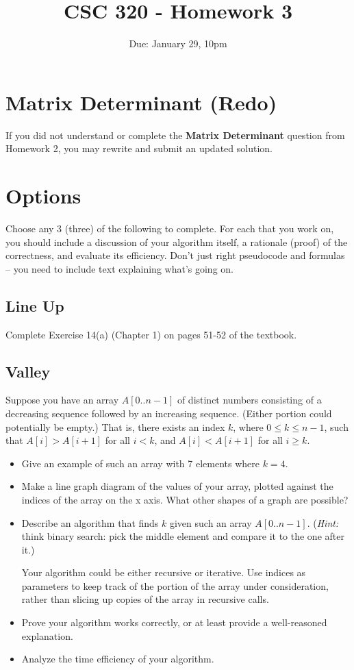 \documentclass[12pt]{article}
\title{CSC 320 - Homework 3}
\author{}
\date{Due: January 29, 10pm}
\begin{document}
{\small \tableofcontents}

\section{Matrix Determinant (Redo)}

If you did not understand or complete the \textbf{Matrix Determinant} question from Homework 2, you may rewrite and submit an updated solution.

\section{Options}

Choose any 3 (three) of the following to complete. For each that you work on, you should include a discussion of your algorithm itself, a rationale (proof) of the correctness, and evaluate its efficiency. Don't just right pseudocode and formulas -- you need to include text explaining what's going on.

\subsection{Line Up}

Complete Exercise 14(a) (Chapter 1) on pages 51-52 of the textbook.

\subsection{Valley}

Suppose you have an array $A[0..n-1]$ of distinct numbers consisting of a decreasing sequence followed by an increasing sequence. (Either portion could potentially be empty.) That is, there exists an index $k$, where $0 \leq k \leq n-1$, such that $A[i] > A[i+1]$ for all $i < k$, and $A[i] < A[i+1]$ for all $i \geq k$.

\begin{itemize}
    \item Give an example of such an array with 7 elements where $k = 4$.
    
    \item Make a line graph diagram of the values of your array, plotted against the indices of the array on the x axis. What other shapes of a graph are possible?

    \item Describe an algorithm that finds $k$ given such an array $A[0..n-1]$. (\emph{Hint:} think binary search: pick the middle element and compare it to the one after it.)
    
    Your algorithm could be either recursive or iterative. Use indices as parameters to keep track of the portion of the array under consideration, rather than slicing up copies of the array in recursive calls.

    \item Prove your algorithm works correctly, or at least provide a well-reasoned explanation.

    \item Analyze the time efficiency of your algorithm.
\end{itemize}
\end{document}
